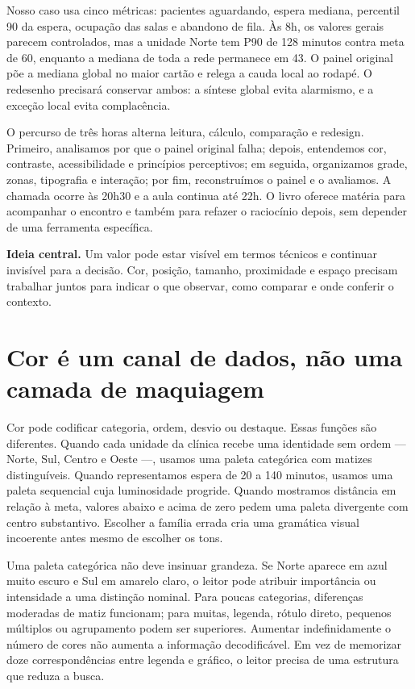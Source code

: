 Nosso caso usa cinco métricas: pacientes aguardando, espera mediana, percentil 90 da espera, ocupação das salas e abandono de fila. Às 8h, os valores gerais parecem controlados, mas a unidade Norte tem P90 de 128 minutos contra meta de 60, enquanto a mediana de toda a rede permanece em 43. O painel original põe a mediana global no maior cartão e relega a cauda local ao rodapé. O redesenho precisará conservar ambos: a síntese global evita alarmismo, e a exceção local evita complacência.

O percurso de três horas alterna leitura, cálculo, comparação e redesign. Primeiro, analisamos por que o painel original falha; depois, entendemos cor, contraste, acessibilidade e princípios perceptivos; em seguida, organizamos grade, zonas, tipografia e interação; por fim, reconstruímos o painel e o avaliamos. A chamada ocorre às 20h30 e a aula continua até 22h. O livro oferece matéria para acompanhar o encontro e também para refazer o raciocínio depois, sem depender de uma ferramenta específica.

\begin{SummaryBox}
\textbf{Ideia central.} Um valor pode estar visível em termos técnicos e continuar invisível para a decisão. Cor, posição, tamanho, proximidade e espaço precisam trabalhar juntos para indicar o que observar, como comparar e onde conferir o contexto.
\end{SummaryBox}

\section{Cor é um canal de dados, não uma camada de maquiagem}

Cor pode codificar categoria, ordem, desvio ou destaque. Essas funções são diferentes. Quando cada unidade da clínica recebe uma identidade sem ordem --- Norte, Sul, Centro e Oeste ---, usamos uma paleta categórica com matizes distinguíveis. Quando representamos espera de 20 a 140 minutos, usamos uma paleta sequencial cuja luminosidade progride. Quando mostramos distância em relação à meta, valores abaixo e acima de zero pedem uma paleta divergente com centro substantivo. Escolher a família errada cria uma gramática visual incoerente antes mesmo de escolher os tons.

Uma paleta categórica não deve insinuar grandeza. Se Norte aparece em azul muito escuro e Sul em amarelo claro, o leitor pode atribuir importância ou intensidade a uma distinção nominal. Para poucas categorias, diferenças moderadas de matiz funcionam; para muitas, legenda, rótulo direto, pequenos múltiplos ou agrupamento podem ser superiores. Aumentar indefinidamente o número de cores não aumenta a informação decodificável. Em vez de memorizar doze correspondências entre legenda e gráfico, o leitor precisa de uma estrutura que reduza a busca.

